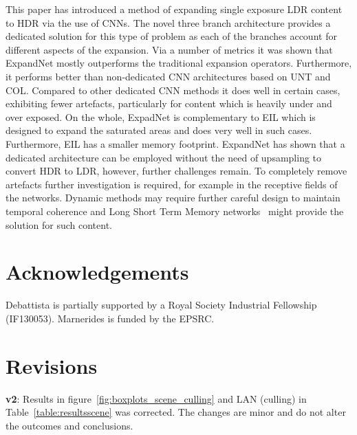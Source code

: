 \documentclass{egpubl}
\newcommand{\tc}[1]{{#1}}
\begin{document}
This paper has introduced a method of expanding single exposure LDR content to
HDR via the use of CNNs. The novel three branch architecture provides a
dedicated solution for this type of problem as each of the branches account for
different aspects of the expansion. Via a number of metrics it was shown that
ExpandNet mostly outperforms the traditional expansion operators. Furthermore,
it performs better than non-dedicated CNN architectures based on UNT and
COL. \tc{Compared to other dedicated CNN methods
\cite{eilertsen2017cnn,endo2017drtmo} it does well in certain cases, exhibiting
fewer artefacts, particularly for content which is heavily under and over
exposed.} On the whole, ExpadNet is complementary to EIL which is designed to
expand the saturated areas and does very well in such cases. Furthermore, EIL
has a smaller memory footprint. ExpandNet has shown that a dedicated
architecture can be employed without the need of upsampling to convert HDR to
LDR, however, further challenges remain. \tc{To completely remove artefacts
further investigation is required, for example in the receptive fields of the
networks.} Dynamic methods may require further careful design to maintain
temporal coherence and Long Short Term Memory
networks~\cite{hochreiter1997lstm} might provide the solution for such content.


\section*{Acknowledgements}

Debattista is partially supported by a Royal Society Industrial Fellowship (IF130053).
Marnerides is funded by the EPSRC. 
\section*{Revisions}

\textbf{v2}: Results in figure~\ref{fig:boxplots_scene_culling} and LAN (culling)
in Table~\ref{table:resultsscene} was corrected. The changes are minor and
do not alter the outcomes and conclusions.




\end{document}
